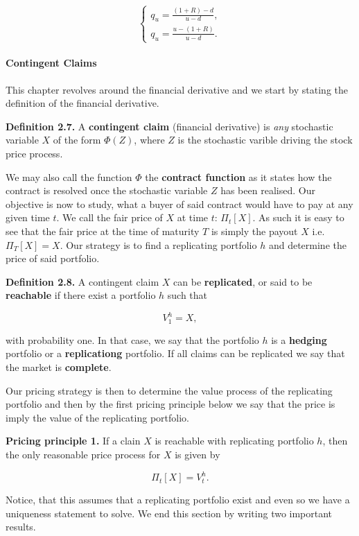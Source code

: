 \documentclass[
]{article}
\begin{document}
\[\left\{\begin{matrix}q_u=\frac{(1+R)-d}{u-d},\\ q_u=\frac{u-(1+R)}{u-d}.\end{matrix}\right.\]

\hypertarget{contingent-claims}{%
\paragraph{Contingent Claims}\label{contingent-claims}}

This chapter revolves around the financial derivative and we start by
stating the definition of the financial derivative.

\textbf{Definition 2.7.} A \textbf{contingent claim} (financial
derivative) is \emph{any} stochastic variable \(X\) of the form
\(\Phi(Z)\), where \(Z\) is the stochastic varible driving the stock
price process.

We may also call the function \(\Phi\) the \textbf{contract function} as
it states how the contract is resolved once the stochastic variable
\(Z\) has been realised. Our objective is now to study, what a buyer of
said contract would have to pay at any given time \(t\). We call the
fair price of \(X\) at time \(t\): \(\Pi_t[X]\). As such it is easy to
see that the fair price at the time of maturity \(T\) is simply the
payout \(X\) i.e.~\(\Pi_T[X]=X\). Our strategy is to find a replicating
portfolio \(h\) and determine the price of said portfolio.

\textbf{Definition 2.8.} A contingent claim \(X\) can be
\textbf{replicated}, or said to be \textbf{reachable} if there exist a
portfolio \(h\) such that

\[
V_1^h=X,
\]

with probability one. In that case, we say that the portfolio \(h\) is a
\textbf{hedging} portfolio or a \textbf{replicationg} portfolio. If all
claims can be replicated we say that the market is \textbf{complete}.

Our pricing strategy is then to determine the value process of the
replicating portfolio and then by the first pricing principle below we
say that the price is imply the value of the replicating portfolio.

\textbf{Pricing principle 1.} If a clain \(X\) is reachable with
replicating portfolio \(h\), then the only reasonable price process for
\(X\) is given by

\[
\Pi_t[X]=V_t^h.
\]

Notice, that this assumes that a replicating portfolio exist and even so
we have a uniqueness statement to solve. We end this section by writing
two important results.
\end{document}
